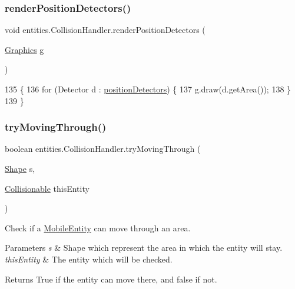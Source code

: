 \subsubsection{\texorpdfstring{render\+Position\+Detectors()}{renderPositionDetectors()}}
{\footnotesize\ttfamily void entities.\+Collision\+Handler.\+render\+Position\+Detectors (\begin{DoxyParamCaption}\item[{\mbox{\hyperlink{classorg_1_1newdawn_1_1slick_1_1_graphics}{Graphics}}}]{g }\end{DoxyParamCaption})\hspace{0.3cm}{\ttfamily [inline]}}


\begin{DoxyCode}
135                                                     \{
136         \textcolor{keywordflow}{for} (Detector d : \mbox{\hyperlink{classentities_1_1_collision_handler_ac8a71d4c1785179065bb3461aae87a1f}{positionDetectors}}) \{
137             g.draw(d.getArea());
138         \}
139     \}
\end{DoxyCode}
\mbox{\label{classentities_1_1_collision_handler_a8aedd2c44d177b1af64be0d7442ec3bb}} 
\subsubsection{\texorpdfstring{try\+Moving\+Through()}{tryMovingThrough()}}
{\footnotesize\ttfamily boolean entities.\+Collision\+Handler.\+try\+Moving\+Through (\begin{DoxyParamCaption}\item[{\mbox{\hyperlink{classorg_1_1newdawn_1_1slick_1_1geom_1_1_shape}{Shape}}}]{s,  }\item[{\mbox{\hyperlink{interfaceentities_1_1_collisionable}{Collisionable}}}]{this\+Entity }\end{DoxyParamCaption})\hspace{0.3cm}{\ttfamily [inline]}}

Check if a \mbox{\hyperlink{classentities_1_1_mobile_entity}{Mobile\+Entity}} can move through an area.


\begin{DoxyParams}{Parameters}
{\em s} & Shape which represent the area in which the entity will stay. \\
\hline
{\em this\+Entity} & The entity which will be checked. \\
\hline
\end{DoxyParams}
\begin{DoxyReturn}{Returns}
True if the entity can move there, and false if not. 
\end{DoxyReturn}


